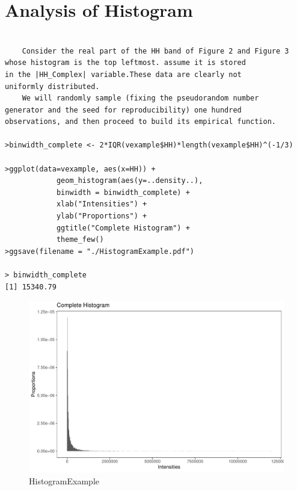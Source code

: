 \documentclass{article}
\begin{document}
	\section{Analysis of Histogram}
	\begin{lstlisting}[frame=tb]
	
	Consider the real part of the HH band of Figure 2 and Figure 3 
whose histogram is the top leftmost. assume it is stored 
in the |HH_Complex| variable.These data are clearly not 
uniformly distributed.
	We will randomly sample (fixing the pseudorandom number 
generator and the seed for reproducibility) one hundred 
observations, and then proceed to build its empirical function.
	
>binwidth_complete <- 2*IQR(vexample$HH)*length(vexample$HH)^(-1/3)

>ggplot(data=vexample, aes(x=HH)) + 
			geom_histogram(aes(y=..density..), 
			binwidth = binwidth_complete) + 
			xlab("Intensities") +
			ylab("Proportions") +
			ggtitle("Complete Histogram") +
			theme_few()
>ggsave(filename = "./HistogramExample.pdf")

> binwidth_complete
[1] 15340.79

	\end{lstlisting}
	\begin{figure}
		\centering
		\includegraphics[width=1\linewidth]{HistogramExample.pdf}
		\caption{HistogramExample}
		\label{fig:HistogramExample}
	\end{figure}
\end{document}

